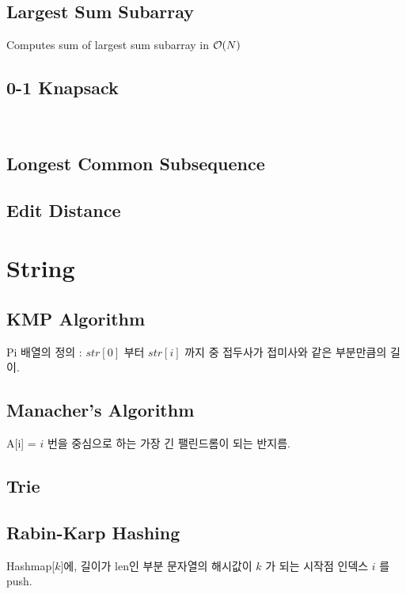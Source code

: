 \documentclass[landscape,8pt]{article}
\begin{document}
\begin{multicols}{2}
  \subsection{Largest Sum Subarray}
    Computes sum of largest sum subarray in $\order{N}$
      

  \subsection{0-1 Knapsack}
    \

  \subsection{Longest Common Subsequence}
    

  \subsection{Edit Distance}
    

\section{String}
  \subsection{KMP Algorithm}
    Pi 배열의 정의 : $str[0]$ 부터 $str[i]$ 까지 중 접두사가 접미사와 같은 부분만큼의 길이.
    
  \subsection{Manacher's Algorithm}
    A[i] = $i$ 번을 중심으로 하는 가장 긴 팰린드롬이 되는 반지름.
    
  \subsection{Trie}
    
  \subsection{Rabin-Karp Hashing}
    Hashmap[$k$]에, 길이가 len인 부분 문자열의 해시값이 $k$ 가 되는 시작점 인덱스 $i$ 를 push.
    
\columnbreak


\end{multicols}
\end{document}
